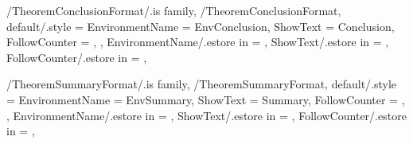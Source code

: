 \newcommand{\InsertAcknowledgment}[1]
{%
  \InsertTheoremContent[\empty]{%
    \GetTheoremAcknowledgmentFormatEnvironmentName}{#1}%
} %

\newcommand{\InitTheoremAcknowledgmentFormat}
{%
  \theoremstyle{definition}%
  \ifthenelse{\equal{\GetTheoremAcknowledgmentFormatFollowCounter}{\empty}}%
  {%
    \newtheorem*{%
      \GetTheoremAcknowledgmentFormatEnvironmentName}{%
      \GetTheoremAcknowledgmentFormatShowText}
  }%
  {%
    \newtheorem{%
      \GetTheoremAcknowledgmentFormatEnvironmentName}{%
      \GetTheoremAcknowledgmentFormatShowText}[%
      \GetTheoremAcknowledgmentFormatFollowCounter]%
  }%
} %


\pgfkeys
{
  /TheoremConclusionFormat/.is family, /TheoremConclusionFormat,
  default/.style =
  {
    EnvironmentName = {EnvConclusion},
    ShowText = {Conclusion},
    FollowCounter = \empty,
  },
  EnvironmentName/.estore in = \GetTheoremConclusionFormatEnvironmentName,
  ShowText/.estore in = \GetTheoremConclusionFormatShowText,
  FollowCounter/.estore in = \GetTheoremConclusionFormatFollowCounter,
} %

\newcommand{\InsertConclusion}[1]
{%
  \InsertTheoremContent[\empty]{%
    \GetTheoremConclusionFormatEnvironmentName}{#1}%
} %

\newcommand{\InitTheoremConclusionFormat}
{%
  \theoremstyle{definition}%
  \ifthenelse{\equal{\GetTheoremConclusionFormatFollowCounter}{\empty}}%
  {%
    \newtheorem*{%
      \GetTheoremConclusionFormatEnvironmentName}{%
      \GetTheoremConclusionFormatShowText}
  }%
  {%
    \newtheorem{%
      \GetTheoremConclusionFormatEnvironmentName}{%
      \GetTheoremConclusionFormatShowText}[%
      \GetTheoremConclusionFormatFollowCounter]%
  }%
} %


\pgfkeys
{
  /TheoremSummaryFormat/.is family, /TheoremSummaryFormat,
  default/.style =
  {
    EnvironmentName = {EnvSummary},
    ShowText = {Summary},
    FollowCounter = \empty,
  },
  EnvironmentName/.estore in = \GetTheoremSummaryFormatEnvironmentName,
  ShowText/.estore in = \GetTheoremSummaryFormatShowText,
  FollowCounter/.estore in = \GetTheoremSummaryFormatFollowCounter,
} %

\newcommand{\InsertSummary}[1]
{%
  \InsertTheoremContent[\empty]{%
    \GetTheoremSummaryFormatEnvironmentName}{#1}%
} %

